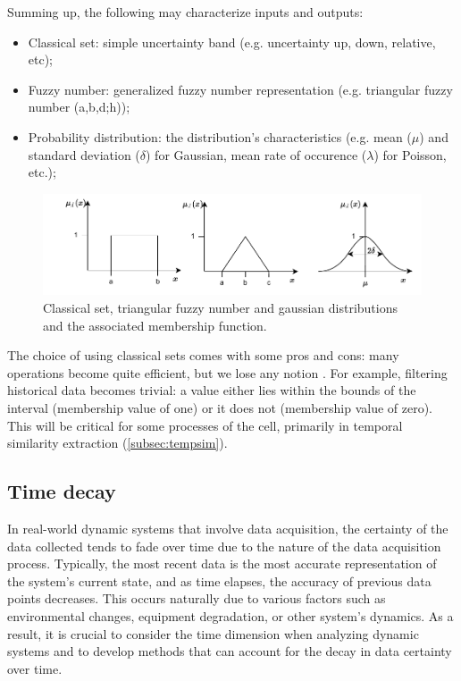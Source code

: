 Summing up, the following may characterize inputs and outputs:

\begin{itemize}
    \item Classical set: simple uncertainty band (e.g. uncertainty up, down, relative, etc);
    \item Fuzzy number: generalized fuzzy number representation \cite{Zhang2019} (e.g. triangular fuzzy number (a,b,d;h));
    \item Probability distribution: the distribution's characteristics (e.g. mean ($\mu$) and standard deviation ($\delta$) for Gaussian, mean rate of occurence ($\lambda$) for Poisson, etc.);
\end{itemize}

\begin{figure}[h!]
    \centering
    \includegraphics[width=15cm]{figures/chapter4/cell/classic_fuzzy_gaussian.pdf}
    \caption{Classical set, triangular fuzzy number and gaussian distributions and the associated membership function.}
    \label{fig:classicfuzzygaussian}
\end{figure}

The choice of using classical sets comes with some pros and cons: many operations become quite efficient, but we lose any notion . For example, filtering historical data becomes trivial: a value either lies within the bounds of the interval (membership value of one) or it does not (membership value of zero). This will be critical for some processes of the cell, primarily in temporal similarity extraction (\ref{subsec:tempsim}).

\subsection{Time decay} \label{subsec:timedecay}

In real-world dynamic systems that involve data acquisition, the certainty of the data collected tends to fade over time due to the nature of the data acquisition process. Typically, the most recent data is the most accurate representation of the system's current state, and as time elapses, the accuracy of previous data points decreases. This occurs naturally due to various factors such as environmental changes, equipment degradation, or other system's dynamics. As a result, it is crucial to consider the time dimension when analyzing dynamic systems and to develop methods that can account for the decay in data certainty over time.

